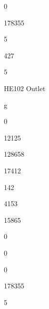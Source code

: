 \documentclass[a4paper,portrait,12pt]{article}
\begin{document}
0





178355





5





427





5





\begin{flushleft}
HE102 Outlet
\end{flushleft}





\begin{flushleft}
g
\end{flushleft}





0





12125





128658





17412





142





4153





15865





0





0





0





178355





5
\end{document}
